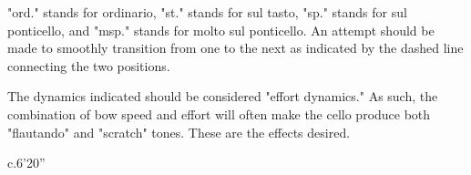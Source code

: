 \documentclass[10pt]{article}
\begin{document}
 "ord." stands for ordinario, "st." stands for sul tasto, "sp." stands for sul ponticello, and "msp." stands for molto sul ponticello. An attempt should be made to smoothly transition from one to the next as indicated by the dashed line connecting the two positions.

 The dynamics indicated should be considered "effort dynamics." As such, the combination of bow speed and effort will often make the cello produce both "flautando" and "scratch" tones. These are the effects desired.

\vspace*{6\baselineskip}

\begin{center}
c.6'20''
\end{center}
\end{document}
